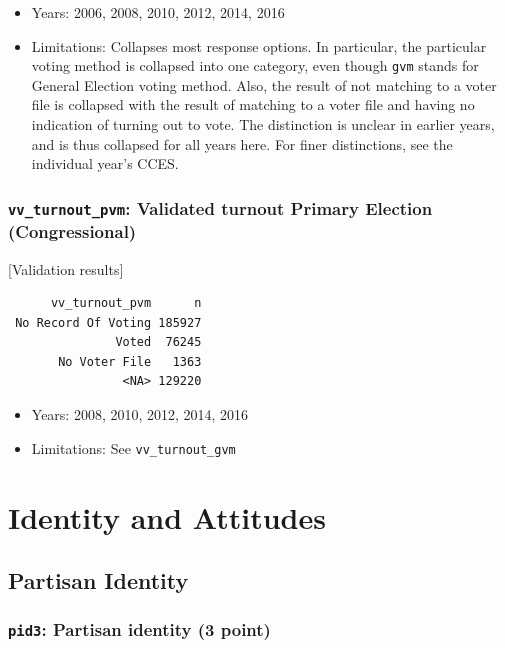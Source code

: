 \documentclass[10pt,article,oneside]{memoir}
\theoremstyle{definition}
\begin{document}
\begin{itemize}
\tightlist
\item
  Years: 2006, 2008, 2010, 2012, 2014, 2016
\item
  Limitations: Collapses most response options. In particular, the
  particular voting method is collapsed into one category, even though
  \texttt{gvm} stands for General Election voting method. Also, the
  result of not matching to a voter file is collapsed with the result of
  matching to a voter file and having no indication of turning out to
  vote. The distinction is unclear in earlier years, and is thus
  collapsed for all years here. For finer distinctions, see the
  individual year's CCES.
\end{itemize}

\subsubsection{\texorpdfstring{\texttt{vv\_turnout\_pvm}: Validated
turnout Primary Election
(Congressional)}{vv\_turnout\_pvm: Validated turnout Primary Election (Congressional)}}\label{vv_turnout_pvm-validated-turnout-primary-election-congressional}

{[}Validation results{]}

\begin{verbatim}
      vv_turnout_pvm      n
 No Record Of Voting 185927
               Voted  76245
       No Voter File   1363
                <NA> 129220
\end{verbatim}

\begin{itemize}
\tightlist
\item
  Years: 2008, 2010, 2012, 2014, 2016
\item
  Limitations: See \texttt{vv\_turnout\_gvm}
\end{itemize}

\newpage

\section{Identity and Attitudes}\label{identity-and-attitudes}

\subsection{Partisan Identity}\label{partisan-identity}

\subsubsection{\texorpdfstring{\texttt{pid3}: Partisan identity (3
point)}{pid3: Partisan identity (3 point)}}\label{pid3-partisan-identity-3-point}
\end{document}
